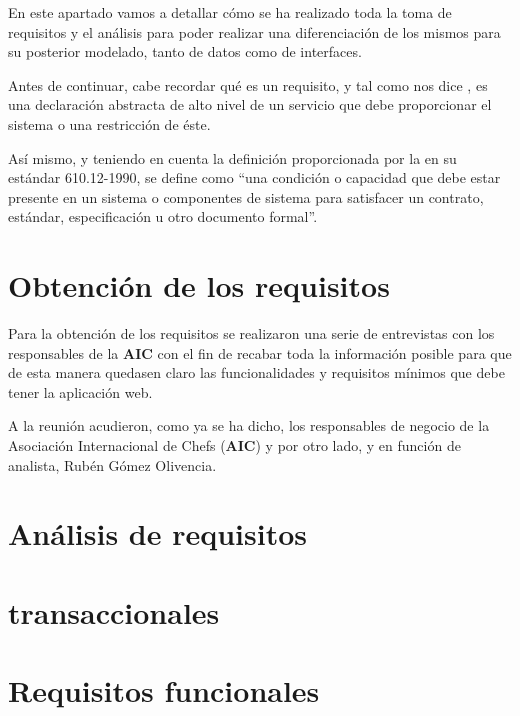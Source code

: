 \documentclass{\ClassPath/viu-tfm-template}
\begin{document}
En este apartado vamos a detallar cómo se ha realizado toda la toma de requisitos y el análisis para poder realizar una diferenciación de los mismos para su posterior modelado, tanto de datos como de interfaces.

Antes de continuar, cabe recordar qué es un requisito, y tal como nos dice \textcite{Sommerville2005}, es una declaración abstracta de alto nivel de un servicio que debe proporcionar el sistema o una restricción de éste.

Así mismo, y teniendo en cuenta la definición proporcionada por la \textcite{IEEE610} en su estándar 610.12-1990, se define como “una condición o capacidad que debe estar presente en un sistema o componentes de sistema para satisfacer un contrato, estándar, especificación u otro documento formal”.


\section{Obtención de los requisitos}
Para la obtención de los requisitos se realizaron una serie de entrevistas con los responsables de la \textbf{AIC} con el fin de recabar toda la información posible para que de esta manera quedasen claro las funcionalidades y requisitos mínimos que debe tener la aplicación web.

A la reunión acudieron, como ya se ha dicho, los responsables de negocio de la Asociación Internacional de Chefs (\textbf{AIC}) y por otro lado, y en función de analista, Rubén Gómez Olivencia.




\section{Análisis de requisitos}



\section{transaccionales}


\section{Requisitos funcionales}
\end{document}
